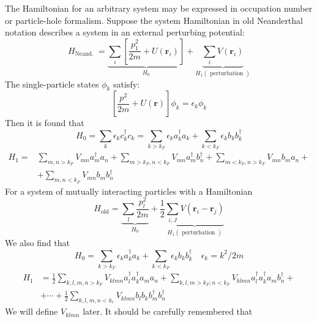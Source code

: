 The Hamiltonian for an arbitrary system may be expressed in occupation number or particle-hole formalism. Suppose the system Hamiltonian in old Neanderthal notation describes a system in an external perturbing potential:
\begin{equation}H_{\text {Neand. }}=\underbrace{\sum_{i}\left[\frac{p_{1}^{2}}{2 m}+U\left(\mathbf{r}_{i}\right)\right]}_{H_{0}}+\underbrace{\sum_{i} V\left(\mathbf{r}_{i}\right)}_{H_{1}(\text { perturbation })}\end{equation}
The single-particle states $\phi_k$ satisfy:
\begin{equation}\left[\frac{p^{2}}{2 m}+U(\mathbf{r})\right] \phi_{k}=\epsilon_{k} \phi_{k}\end{equation}
Then it is found that
\begin{equation}H_{0}=\sum_{k} \epsilon_{k} c^{\dagger}_{k} c_{k}=\sum_{k>k_{F}} \epsilon_{k} a_{k}^{\dagger} a_{k}+\sum_{k<k_{F}} \epsilon_{k} b_{k} b^{\dagger}_{k}
\label{H0-Nead}
\end{equation}
\begin{equation}\begin{aligned}
H_{1}=& \sum_{m, n>k_{F}} V_{m n} a_{m}^{\dagger} a_{n}+\sum_{m>k_{F},n<k_F} V_{m n} a_{m}^{\dagger} b_{n}^{\dagger}+\sum_{m<k_{F}, n>k_{F}} V_{m n} b_{m} a_{n}+\\
&+\sum_{m, n<k_{F}} V_{m n} b_{m} b_{n}^{\dagger}
\end{aligned}
\label{H1}
\end{equation}
For a system of mutually interacting particles with a Hamiltonian
\begin{equation}H_{\mathrm{old}}=\underbrace{\sum_{l} \frac{p_{l}^{2}}{2 m}}_{H_{0}}+\frac{1}{2} \underbrace{\sum_{i, J} V\left(\mathbf{r}_{i}-\mathbf{r}_{j}\right)}_{H_{1}(\text { perturbation })}
\label{mutual-interact-hamiltonian}
\end{equation}
We also find that
\begin{equation}H_{0}=\sum_{k>k_{F}} \epsilon_{k} a_{k}^{\dagger} a_{k}+\sum_{k<k_{F}} \epsilon_{k} b_{k} b^{\dagger}_{k}\quad\epsilon_k=k^2/2m\end{equation}
\begin{equation}\begin{aligned}
H_{1}&=\frac{1}{2} \sum_{k, l, m, n>k_{F}} V_{k l m n} a_{l}^{\dagger} a_{k}^{\dagger} a_{m} a_{n}+\sum_{k, l, m>k_{F};n<k_F} V_{k l m n} a_{l}^{\dagger} a^{\dagger}_{k} a_{m} b_{n}^{\dagger}+\\
&+\cdots+\frac{1}{2} \sum_{k, l, m, n<k_{r}} V_{k l m n} b_{l} b_{k} b_{m}^{\dagger} b_{n}^{\dagger}
\end{aligned}
\label{mutual-interact-H1}
\end{equation}
We will define $V_{klmn}$ later. It should be carefully remembered that \textbf{}

